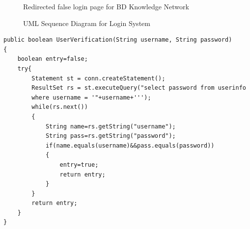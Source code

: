 \documentclass{scrreprt}
\begin{document}
\begin{figure}[h]
\begin{center}
\end{center} 
\caption{Redirected false login page for BD Knowledge Network\label{loginfail}}
\end{figure}
\begin{figure}[h]
\begin{center}
\end{center} 
\caption{UML Sequence Diagram for Login System\label{test}}
\end{figure}
\begin{verbatim}
public boolean UserVerification(String username, String password)
{
    boolean entry=false;
	try{
		Statement st = conn.createStatement();
		ResultSet rs = st.executeQuery("select password from userinfo 
        where username = '"+username+''');
		while(rs.next())
		{
			String name=rs.getString("username");
			String pass=rs.getString("password");
			if(name.equals(username)&&pass.equals(password))
			{
				entry=true;
				return entry;
			}
		}    
		return entry;
	}
}
\end{verbatim}
\end{document}
